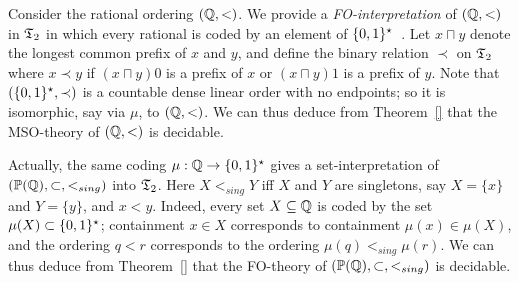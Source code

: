 \begin{example} 
Consider the rational ordering $(\mathbb{Q},<)$. We provide a {\em FO-interpretation} of $(\mathbb{Q},<)$ in $\mathfrak{T}_2$ in which 
every rational is coded by an element of $\{0,1\}^\star$~\cite{Rabi69}. Let $x \sqcap y$ denote the longest common prefix of $x$ and $y$, and define the 
binary relation  $\prec$ on $\mathfrak{T}_2$ where $x \prec y$ if $(x \sqcap y)0$ is a prefix of $x$ or 
$(x \sqcap y)1$ is a prefix of $y$. %
Note that $(\{0,1\}^\star,\prec)$ is a countable dense linear order with no endpoints;  so it is isomorphic, say via $\mu$, to $(\mathbb{Q},<)$. We can thus deduce from Theorem~\ref{} that the MSO-theory of $(\mathbb{Q},<)$ is decidable.

Actually, the same coding $\mu:\mathbb{Q} \to \{0,1\}^\star$ gives a set-interpretation of $({\mathbb P}(\mathbb{Q}),\subset,<_{sing})$ into $\mathfrak{T}_2$. Here 
$X <_{sing} Y$ iff $X$ and $Y$ are singletons, say $X = \{x\}$ and $Y = \{y\}$, and $x < y$. Indeed, every set $X \subseteq \mathbb{Q}$ is coded by the set $\mu(X) \subset \{0,1\}^\star$; containment $x \in X$ corresponds to containment $\mu(x) \in \mu(X)$, and the ordering $q < r$ corresponds to the ordering $\mu(q) <_{sing} \mu(r)$. 
We can thus deduce from Theorem~\ref{} that the FO-theory of  $({\mathbb P}(\mathbb{Q}),\subset,<_{sing})$ is decidable. 
\end{example}





